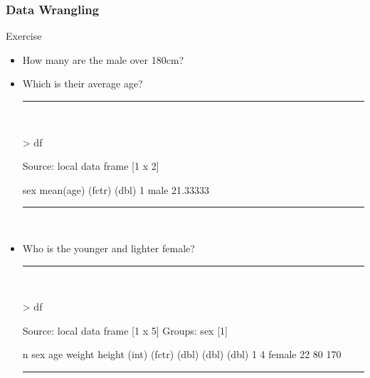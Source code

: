 \documentclass{beamer}
\begin{document}
\begin{frame}[fragile]
	\frametitle{Data Wrangling}
	\centering \LARGE Exercise
	\begin{itemize}
		\small
	\item How many are the male over 180cm? 
		\item Which is their average age?
\rule{\textwidth}{0.4pt}\\
\tiny
\setlength{\fancyvrbtopsep}{-1pt}
\setlength{\fancyvrbpartopsep}{-1pt}
\begin{Schunk}
\begin{Sinput}
> df %
\end{Sinput}
\begin{Soutput}
Source: local data frame [1 x 2]

     sex mean(age)
  (fctr)     (dbl)
1   male  21.33333
\end{Soutput}
\end{Schunk}
\rule{\textwidth}{0.4pt}\\
\small
		\item Who is the younger and lighter female? 
		\rule{\textwidth}{0.4pt}\\
\tiny
\setlength{\fancyvrbtopsep}{-1pt}
\setlength{\fancyvrbpartopsep}{-1pt}
\begin{Schunk}
\begin{Sinput}
> df %
\end{Sinput}
\begin{Soutput}
Source: local data frame [1 x 5]
Groups: sex [1]

      n    sex   age weight height
  (int) (fctr) (dbl)  (dbl)  (dbl)
1     4 female    22     80    170
\end{Soutput}
\end{Schunk}
\rule{\textwidth}{0.4pt}\\
\small

	\end{itemize}
	\small
\end{frame}
\end{document}
